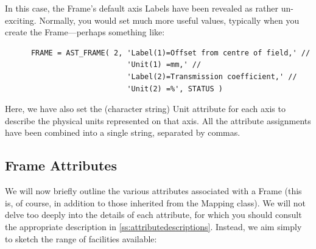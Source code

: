 \documentclass[twoside,11pt]{article}
\newcommand{\htmlref}[2]{#1}
\newcommand{\appref}[1]{Appendix~\ref{#1}}
\renewcommand{\appref}[1]{\ref{#1}}
\begin{document}
In this case, the Frame's default axis Labels have been revealed as
rather un-exciting. Normally, you would set much more useful values,
typically when you create the Frame---perhaps something like:

\small
\begin{verbatim}
      FRAME = AST_FRAME( 2, 'Label(1)=Offset from centre of field,' //
                            'Unit(1) =mm,' //
                            'Label(2)=Transmission coefficient,' //
                            'Unit(2) =%', STATUS )
\end{verbatim}
\normalsize

Here, we have also set the (character string) Unit attribute for each
axis to describe the physical units represented on that axis. All the
attribute assignments have been combined into a single string,
separated by commas.

\subsection{\label{ss:frameattributes}Frame Attributes}

We will now briefly outline the various attributes associated with a
\htmlref{Frame}{Frame} (this is, of course, in addition to those inherited from the
\htmlref{Mapping}{Mapping} class). We will not delve too deeply into the details of each
attribute, for which you should consult the appropriate description in
\appref{ss:attributedescriptions}. Instead, we aim simply to sketch
the range of facilities available:
\end{document}
